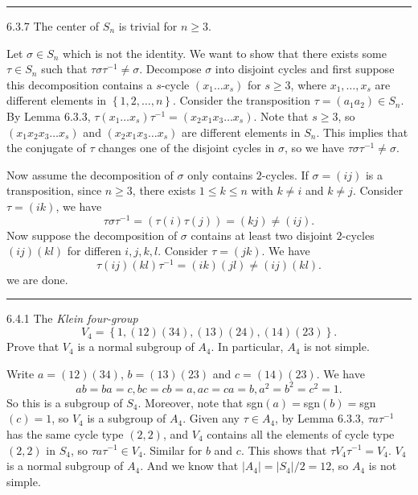 \documentclass[a4paper, 12pt]{article}
\begin{document}
\noindent\rule{7in}{2.8pt}
\begin{problem}{6.3.7}
The center of \(S_n\) is trivial for \(n\geq 3\).
\end{problem}
\begin{solution}
Let \(\sigma\in S_n\) which is not the identity. We want to show that there exists some \(\tau\in S_n\) such that \(\tau\sigma\tau^{-1}\neq \sigma\). Decompose \(\sigma\) into disjoint cycles and first suppose 
this decomposition contains a \(s\)-cycle \((x_1\ldots x_s)\) for \(s\geq 3\), where \(x_1,\ldots,x_s\) are different elements in \(\left\{ 1,2,\ldots,n \right\}\). Consider the transposition \(\tau=(a_1 a_2)\in S_n\). By Lemma 6.3.3, 
\(\tau(x_1\ldots x_s)\tau^{-1}=(x_2 x_1 x_3\ldots x_s)\). Note that \(s\geq 3\), so \((x_1x_2x_3\ldots x_s)\) and \((x_2x_1x_3\ldots x_s)\) are different elements in \(S_n\). This implies that the conjugate of \(\tau\) changes one of the 
disjoint cycles in \(\sigma\), so we have \(\tau\sigma\tau^{-1}\neq \sigma\).

Now assume the decomposition of \(\sigma\) only contains \(2\)-cycles. If \(\sigma=(ij)\) is a transposition, since \(n\geq 3\), there exists \(1\leq k\leq n\) with \(k\neq i\) and \(k\neq j\). Consider \(\tau=(ik)\), we have 
\[\tau\sigma\tau^{-1}=(\tau(i) \tau(j))=(kj)\neq (ij).\]
Now suppose the decomposition of \(\sigma\) contains at least two disjoint \(2\)-cycles \((ij)(kl)\) for differen \(i,j,k,l\). Consider \(\tau=(jk)\). We have 
\[\tau(ij)(kl)\tau^{-1}=(ik)(jl)\neq (ij)(kl).\]
we are done.
\end{solution}

\noindent\rule{7in}{2.8pt}
\begin{problem}{6.4.1}
The \textit{Klein four-group} 
\[V_4=\left\{ 1,(12)(34),(13)(24),(14)(23) \right\}.\]
Prove that \(V_4\) is a normal subgroup of \(A_4\). In particular, \(A_4\) is not simple.
\end{problem}
\begin{solution}
Write \(a=(12)(34)\), \(b=(13)(23)\) and \(c=(14)(23)\). We have 
\[ab=ba=c,bc=cb=a,ac=ca=b, a^2=b^2=c^2=1.\]
So this is a subgroup of \(S_4\). Moreover, note that sgn\((a)=\)sgn\((b)=\)sgn\((c)=1\), so \(V_4\) is a subgroup of \(A_4\). Given any \(\tau\in A_4\), by Lemma 6.3.3, \(\tau a\tau^{-1}\) has the same cycle type \((2,2)\), and \(V_4\) contains all the elements of cycle type 
\((2,2)\) in \(S_4\), so \(\tau a\tau^{-1}\in V_4\). Similar for \(b\) and \(c\). This shows that \(\tau V_4 \tau^{-1}=V_4\). \(V_4\) is a normal subgroup of \(A_4\). And we know that \(|A_4|=|S_4|/2=12\), so \(A_4\) is not simple.
\end{solution}
\end{document}

